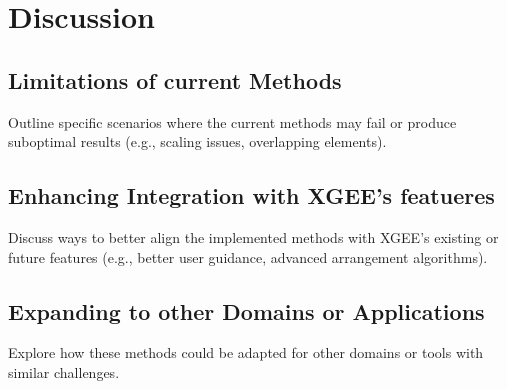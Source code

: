 \chapter{Discussion}

\section{Limitations of current Methods}
Outline specific scenarios where the current methods may fail or produce suboptimal results (e.g., scaling issues, overlapping elements).
\section{Enhancing Integration with XGEE's featueres}
Discuss ways to better align the implemented methods with XGEE’s existing or future features (e.g., better user guidance, advanced arrangement algorithms).
\section{Expanding to other Domains or Applications}
Explore how these methods could be adapted for other domains or tools with similar challenges.